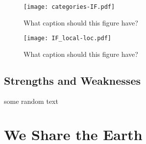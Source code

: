 \documentclass[12pt]{article}
\begin{document}
		\begin{figure}
			\centering
			\texttt{[image: categories-IF.pdf]}
			\caption{What caption should this figure have?}
			\label{fig:IFfactors}
		\end{figure}
		
		\begin{figure}
			\centering
			\texttt{[image: IF\_local-loc.pdf]}
			\caption{What caption should this figure have?}
			\label{fig:IFLocal}
		\end{figure}
		
	\subsection{Strengths and Weaknesses}

		some random text
	
\section*{We Share the Earth}



\newrefcontext
\printbibliography
\end{document}
